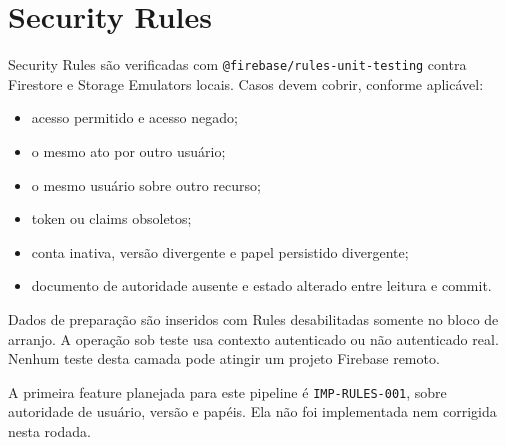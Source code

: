 \section{Security Rules}

Security Rules são verificadas com \texttt{@firebase/rules-unit-testing} contra
Firestore e Storage Emulators locais. Casos devem cobrir, conforme aplicável:

\begin{itemize}
  \item acesso permitido e acesso negado;
  \item o mesmo ato por outro usuário;
  \item o mesmo usuário sobre outro recurso;
  \item token ou claims obsoletos;
  \item conta inativa, versão divergente e papel persistido divergente;
  \item documento de autoridade ausente e estado alterado entre leitura e commit.
\end{itemize}

Dados de preparação são inseridos com Rules desabilitadas somente no bloco de
arranjo. A operação sob teste usa contexto autenticado ou não autenticado real.
Nenhum teste desta camada pode atingir um projeto Firebase remoto.

A primeira feature planejada para este pipeline é \texttt{IMP-RULES-001}, sobre
autoridade de usuário, versão e papéis. Ela não foi implementada nem corrigida
nesta rodada.
